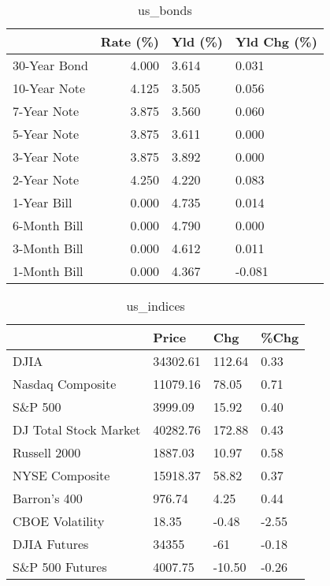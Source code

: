 \documentclass{article}%
\begin{document}
%


\begin{table}[htbp]%
\caption{us\_bonds}%
\centering%
\begin{adjustbox}{width=1\textwidth}%
\begin{tabular}{lrll}
\toprule
             &  Rate (\%) & Yld (\%) & Yld Chg (\%) \\
\midrule
30-Year Bond &     4.000 &   3.614 &       0.031 \\
10-Year Note &     4.125 &   3.505 &       0.056 \\
 7-Year Note &     3.875 &   3.560 &       0.060 \\
 5-Year Note &     3.875 &   3.611 &       0.000 \\
 3-Year Note &     3.875 &   3.892 &       0.000 \\
 2-Year Note &     4.250 &   4.220 &       0.083 \\
 1-Year Bill &     0.000 &   4.735 &       0.014 \\
6-Month Bill &     0.000 &   4.790 &       0.000 \\
3-Month Bill &     0.000 &   4.612 &       0.011 \\
1-Month Bill &     0.000 &   4.367 &      -0.081 \\
\bottomrule
\end{tabular}
%
\end{adjustbox}%
\end{table}

%


\begin{table}[htbp]%
\caption{us\_indices}%
\centering%
\begin{adjustbox}{width=1\textwidth}%
\begin{tabular}{llll}
\toprule
                      &    Price &    Chg &  \%Chg \\
\midrule
                 DJIA & 34302.61 & 112.64 &  0.33 \\
     Nasdaq Composite & 11079.16 &  78.05 &  0.71 \\
              S\&P 500 &  3999.09 &  15.92 &  0.40 \\
DJ Total Stock Market & 40282.76 & 172.88 &  0.43 \\
         Russell 2000 &  1887.03 &  10.97 &  0.58 \\
       NYSE Composite & 15918.37 &  58.82 &  0.37 \\
         Barron's 400 &   976.74 &   4.25 &  0.44 \\
      CBOE Volatility &    18.35 &  -0.48 & -2.55 \\
         DJIA Futures &    34355 &    -61 & -0.18 \\
      S\&P 500 Futures &  4007.75 & -10.50 & -0.26 \\
\bottomrule
\end{tabular}
%
\end{adjustbox}%
\end{table}
\end{document}
